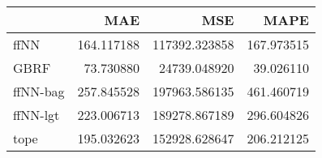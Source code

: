 \begin{tabular}{lrrr}
\toprule
{} &         MAE &            MSE &        MAPE \\
\midrule
ffNN     &  164.117188 &  117392.323858 &  167.973515 \\
GBRF     &   73.730880 &   24739.048920 &   39.026110 \\
ffNN-bag &  257.845528 &  197963.586135 &  461.460719 \\
ffNN-lgt &  223.006713 &  189278.867189 &  296.604826 \\
tope     &  195.032623 &  152928.628647 &  206.212125 \\
\bottomrule
\end{tabular}
